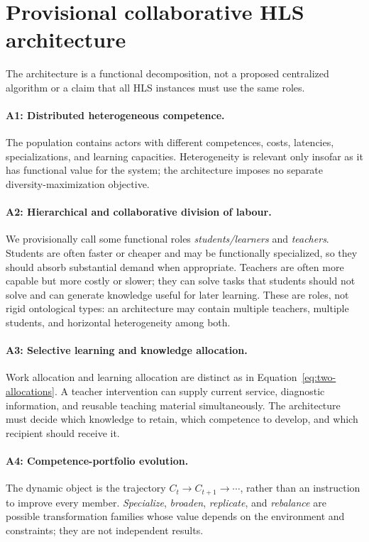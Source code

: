 \section{Provisional collaborative HLS architecture}

The architecture is a functional decomposition, not a proposed centralized algorithm or a claim that all HLS instances must use the same roles.

\paragraph{A1: Distributed heterogeneous competence.} The population contains actors with different competences, costs, latencies, specializations, and learning capacities. Heterogeneity is relevant only insofar as it has functional value for the system; the architecture imposes no separate diversity-maximization objective.

\paragraph{A2: Hierarchical and collaborative division of labour.} We provisionally call some functional roles \emph{students/learners} and \emph{teachers}. Students are often faster or cheaper and may be functionally specialized, so they should absorb substantial demand when appropriate. Teachers are often more capable but more costly or slower; they can solve tasks that students should not solve and can generate knowledge useful for later learning. These are roles, not rigid ontological types: an architecture may contain multiple teachers, multiple students, and horizontal heterogeneity among both.

\paragraph{A3: Selective learning and knowledge allocation.} Work allocation and learning allocation are distinct as in Equation~\eqref{eq:two-allocations}. A teacher intervention can supply current service, diagnostic information, and reusable teaching material simultaneously. The architecture must decide which knowledge to retain, which competence to develop, and which recipient should receive it.

\paragraph{A4: Competence-portfolio evolution.} The dynamic object is the trajectory $C_t\rightarrow C_{t+1}\rightarrow\cdots$, rather than an instruction to improve every member. \emph{Specialize}, \emph{broaden}, \emph{replicate}, and \emph{rebalance} are possible transformation families whose value depends on the environment and constraints; they are not independent results.

